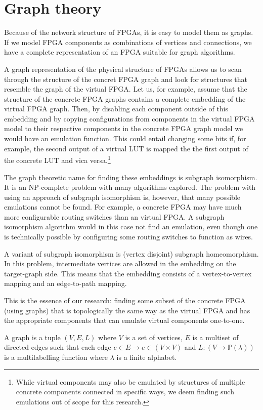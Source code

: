 \section{Graph theory}
Because of the network structure of FPGAs, it is easy to model them as graphs. If we model FPGA components as combinations of vertices and connections, we have a complete representation of an FPGA suitable for graph algorithms.

A graph representation of the physical structure of FPGAs allows us to scan through the structure of the concret FPGA graph and look for structures that resemble the graph of the virtual FPGA. Let us, for example, assume that the structure of the concrete FPGA graphs contains a complete embedding of the virtual FPGA graph. Then, by disabling each component outside of this embedding and by copying configurations from components in the virtual FPGA model to their respective components in the concrete FPGA graph model we would have an emulation function. This could entail changing some bits if, for example, the second output of a virtual LUT is mapped the the first output of the concrete LUT and vica versa.\footnote{While virtual components may also be emulated by structures of multiple concrete components connected in specific ways, we deem finding such emulations out of scope for this research.}

The graph theoretic name for finding these embeddings is subgraph isomorphism. It is an NP-complete problem\cite{cook} with many algorithms explored. The problem with using an approach of subgraph isomorphism is, however, that many possible emulations cannot be found. For example, a concrete FPGA may have much more configurable routing switches than an virtual FPGA. A subgraph isomorphism algorithm would in this case not find an emulation, even though one is technically possible by configuring some routing switches to function as wires.

A variant of subgraph isomorphism is (vertex disjoint) subgraph homeomorphism. In this problem, intermediate vertices are allowed in the embedding on the target-graph side. This means that the embedding consists of a vertex-to-vertex mapping and an edge-to-path mapping.

This is the essence of our research: finding some subset of the concrete FPGA (using graphs) that is topologically the same way as the virtual FPGA and has the appropriate components that can emulate virtual components one-to-one.

\begin{defn}[graph]
A graph is a tuple $(V, E, L)$ where $V$ is a set of vertices, $E$ is a multiset of directed edges such that each edge $e \in E \to e \in (V \times V)$ and $L: (V \to \mathbb{P}(\lambda))$ is a multilabelling function where $\lambda$ is a finite alphabet.
\label{def:graph}
\end{defn}


